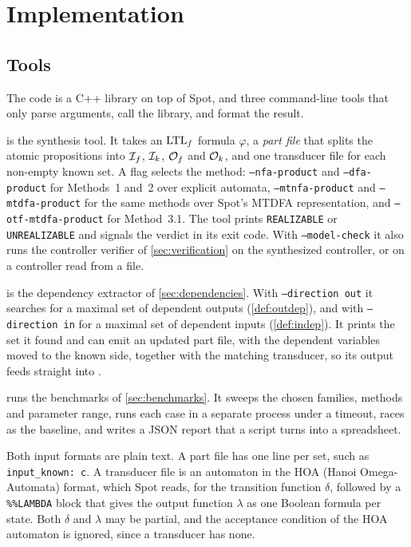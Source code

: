 \section{Implementation}\label{sec:implementation}

\subsection{Tools}

The code is a C++ library on top of Spot, and three command-line tools that only parse arguments, call the library, and format the result.

 is the synthesis tool.
It takes an $\text{LTL}_f$ formula $\varphi$, a \emph{part file} that splits the atomic propositions into $\mathcal{I}_{f}$, $\mathcal{I}_{k}$, $\mathcal{O}_{f}$ and $\mathcal{O}_{k}$, and one transducer file for each non-empty known set.
A flag selects the method: \texttt{--nfa-product} and \texttt{--dfa-product} for Methods~1 and~2 over explicit automata, \texttt{--mtnfa-product} and \texttt{--mtdfa-product} for the same methods over Spot's MTDFA representation, and \texttt{--otf-mtdfa-product} for Method~3.1.
The tool prints \texttt{REALIZABLE} or \texttt{UNREALIZABLE} and signals the verdict in its exit code.
With \texttt{--model-check} it also runs the controller verifier of \cref{sec:verification} on the synthesized controller, or on a controller read from a file.

 is the dependency extractor of \cref{sec:dependencies}.
With \texttt{--direction out} it searches for a maximal set of dependent outputs (\cref{def:outdep}), and with \texttt{--direction in} for a maximal set of dependent inputs (\cref{def:indep}).
It prints the set it found and can emit an updated part file, with the dependent variables moved to the known side, together with the matching transducer, so its output feeds straight into .

 runs the benchmarks of \cref{sec:benchmarks}.
It sweeps the chosen families, methods and parameter range, runs each case in a separate process under a timeout, races  as the baseline, and writes a JSON report that a script turns into a spreadsheet.

Both input formats are plain text.
A part file has one line per set, such as \texttt{input\_known: c}.
A transducer file is an automaton in the HOA (Hanoi Omega-Automata) format, which Spot reads, for the transition function $\delta$, followed by a \texttt{\%\%LAMBDA} block that gives the output function $\lambda$ as one Boolean formula per state.
Both $\delta$ and $\lambda$ may be partial, and the acceptance condition of the HOA automaton is ignored, since a transducer has none.

